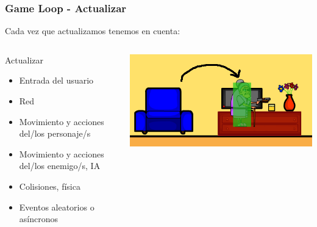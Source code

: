 \begin{frame}
	\frametitle{Game Loop - Actualizar}
	
	Cada vez que actualizamos tenemos en cuenta:
	
	\begin{columns}[c]
	\column{175pt}
		
	\begin{block}{Actualizar}
		\begin{itemize}
			\item Entrada del usuario
			\item Red
			\item Movimiento y acciones del/los personaje/s
			\item Movimiento y acciones del/los enemigo/s, IA
			\item Colisiones, física
			\item Eventos aleatorios o asíncronos
		\end{itemize}            
	\end{block}
	
	\column{125pt}
	
	\begin{center}
		\includegraphics[scale=0.25]{img/grannycolision.png}
	\end{center}	
	
	\end{columns}
	
\end{frame}

